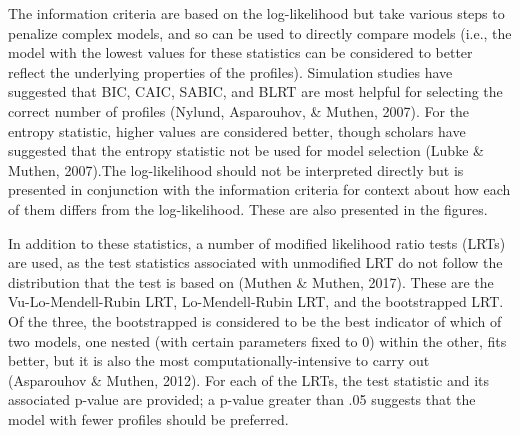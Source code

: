 \documentclass[]{book}
\theoremstyle{definition}
\theoremstyle{definition}
\theoremstyle{definition}
\theoremstyle{remark}
\begin{document}
The information criteria are based on the log-likelihood but take
various steps to penalize complex models, and so can be used to directly
compare models (i.e., the model with the lowest values for these
statistics can be considered to better reflect the underlying properties
of the profiles). Simulation studies have suggested that BIC, CAIC,
SABIC, and BLRT are most helpful for selecting the correct number of
profiles (Nylund, Asparouhov, \& Muthen, 2007). For the entropy
statistic, higher values are considered better, though scholars have
suggested that the entropy statistic not be used for model selection
(Lubke \& Muthen, 2007).The log-likelihood should not be interpreted
directly but is presented in conjunction with the information criteria
for context about how each of them differs from the log-likelihood.
These are also presented in the figures.

In addition to these statistics, a number of modified likelihood ratio
tests (LRTs) are used, as the test statistics associated with unmodified
LRT do not follow the distribution that the test is based on (Muthen \&
Muthen, 2017). These are the Vu-Lo-Mendell-Rubin LRT, Lo-Mendell-Rubin
LRT, and the bootstrapped LRT. Of the three, the bootstrapped is
considered to be the best indicator of which of two models, one nested
(with certain parameters fixed to 0) within the other, fits better, but
it is also the most computationally-intensive to carry out (Asparouhov
\& Muthen, 2012). For each of the LRTs, the test statistic and its
associated p-value are provided; a p-value greater than .05 suggests
that the model with fewer profiles should be preferred.
\end{document}
